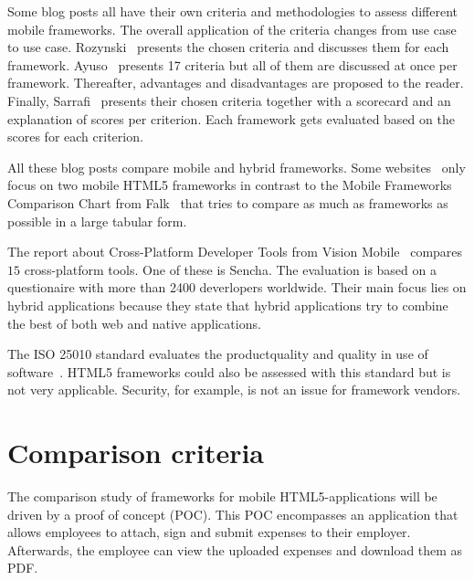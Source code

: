 \documentclass[a4paper]{artikel3}
\begin{document}
Some blog posts \cite{Sarrafi2012a,Ayuso2012,Rozynski2011} all have their own criteria and methodologies to assess different mobile frameworks.  
The overall application of the criteria changes from use case to use case.  
Rozynski~\cite{Rozynski2011} presents the chosen criteria and discusses them for each framework.  
Ayuso~\cite{Ayuso2012} presents 17 criteria but all of them are discussed at once per framework.  
Thereafter,  advantages and disadvantages are proposed to the reader.  
Finally, Sarrafi~\cite{Sarrafi2012a} presents their chosen criteria together with a scorecard and an explanation of scores per criterion.  
Each framework gets evaluated based on the scores for each criterion.

All these blog posts compare mobile and hybrid frameworks.  
Some websites~\cite{Bristowe2012,Burris} only focus on two mobile HTML5 frameworks in contrast to the Mobile Frameworks Comparison Chart from Falk~\cite{Falk2011} that tries to compare as much as frameworks as possible in a large tabular form.

The report about Cross-Platform Developer Tools from Vision Mobile~\cite{Mobile2012} compares $15$ cross-platform tools.
One of these is Sencha.
The evaluation is based on a questionaire with more than 2400 deverlopers worldwide.
Their main focus lies on hybrid applications because they state that hybrid applications try to combine the best of both web and native applications.

The ISO 25010 standard evaluates the productquality and quality in use of software~\cite{Standard2010}.
HTML5 frameworks could also be assessed with this standard but is not very applicable.
Security,  for example,  is not an issue for framework vendors.




\section{Comparison criteria} %
\label{sec:comparisoncriteria}

The comparison study of frameworks for mobile HTML5-applications will be driven by a proof of concept (POC).  
This POC encompasses an application that allows employees to attach, sign and submit expenses to their employer.
Afterwards, the employee can view the uploaded expenses and download them as PDF.
\end{document}
